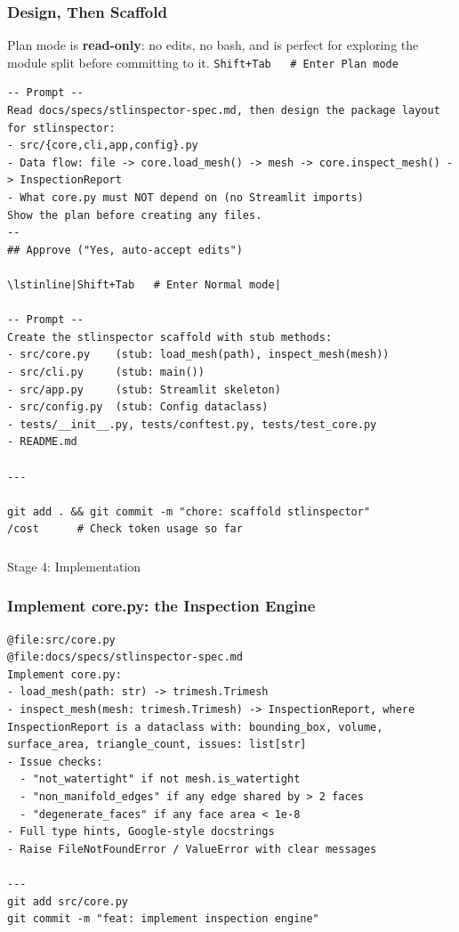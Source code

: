 \begin{frame}[fragile]\frametitle{Design, Then Scaffold}
Plan mode is \textbf{read-only}: no edits, no bash, and is perfect for exploring the module split before committing to it.
\lstinline|Shift+Tab   # Enter Plan mode|

\begin{lstlisting}
-- Prompt --
Read docs/specs/stlinspector-spec.md, then design the package layout for stlinspector:
- src/{core,cli,app,config}.py
- Data flow: file -> core.load_mesh() -> mesh -> core.inspect_mesh() -> InspectionReport
- What core.py must NOT depend on (no Streamlit imports)
Show the plan before creating any files.
--
## Approve ("Yes, auto-accept edits")

\lstinline|Shift+Tab   # Enter Normal mode|

-- Prompt --
Create the stlinspector scaffold with stub methods:
- src/core.py    (stub: load_mesh(path), inspect_mesh(mesh))
- src/cli.py     (stub: main())
- src/app.py     (stub: Streamlit skeleton)
- src/config.py  (stub: Config dataclass)
- tests/__init__.py, tests/conftest.py, tests/test_core.py
- README.md

---

git add . && git commit -m "chore: scaffold stlinspector"
/cost      # Check token usage so far
\end{lstlisting}
\end{frame}


\begin{frame}[fragile]\frametitle{}
\begin{center}
{\Large Stage 4: Implementation}
\end{center}
\end{frame}


\begin{frame}[fragile]\frametitle{Implement core.py: the Inspection Engine}
\begin{lstlisting}
@file:src/core.py
@file:docs/specs/stlinspector-spec.md
Implement core.py:
- load_mesh(path: str) -> trimesh.Trimesh
- inspect_mesh(mesh: trimesh.Trimesh) -> InspectionReport, where InspectionReport is a dataclass with: bounding_box, volume, surface_area, triangle_count, issues: list[str]
- Issue checks:
  - "not_watertight" if not mesh.is_watertight
  - "non_manifold_edges" if any edge shared by > 2 faces
  - "degenerate_faces" if any face area < 1e-8
- Full type hints, Google-style docstrings
- Raise FileNotFoundError / ValueError with clear messages

---
git add src/core.py
git commit -m "feat: implement inspection engine"
\end{lstlisting}
\end{frame}


